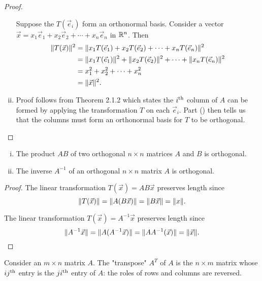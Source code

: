 \documentclass[a4paper,8pt]{article}
\begin{document}
\begin{outline}
\begin{proof}
\begin{enumerate}[i.]
          \backward Suppose the \(T(\vec{e}_i)\) form an orthonormal basis. Consider a vector \(\vec{x} = x_1\vec{e}_1 + x_2\vec{e}_2 + \cdots
          + x_n\vec{e}_n\) in \(\mathbb{R}^n\). Then
          \begin{align*}
            \|T(\vec{x})\|^2 &= \|x_1T(\vec{e}_1) + x_2T(\vec{e}_2) + \cdots + x_nT(\vec{e}_n)\|^2 \\
                                &= \|x_1T(\vec{e}_1)\|^2 + \|x_2T(\vec{e}_2)\|^2 + \cdots + \|x_nT(\vec{e}_n)\|^2 \\
                                &= x_1^2 + x_2^2 + \cdots + x_n^2 \\
                                &= \|\vec{x}\|^2\text{.}
          \end{align*}
        \item
          Proof follows from Theorem 2.1.2 which states the \(i\textsuperscript{th}\) column of \(A\) can be formed by applying the transformation \(T\) on each
          \(\vec{e}_i\). Part () then tells us that the columns must form an orthonormal basis for \(T\) to be orthogonal.
      \end{enumerate}
    \end{proof}

    \begin{enumerate}[i.]
      \item The product \(AB\) of two orthogonal \(n \times n\) matrices \(A\) and \(B\) is orthogonal.
      \item The inverse \(A^{-1}\) of an orthogonal \(n \times n\) matrix \(A\) is orthogonal.
    \end{enumerate}

    \begin{proof}
      \item
        The linear transformation \(T(\vec{x}) = AB\vec{x}\) preserves length since
        \[ \|T(\vec{x})\| = \|A(B\vec{x})\| = \|B\vec{x}\| = \|x\|\text{.} \]
      \item
        The linear transformation \(T(\vec{x}) = A^{-1}\vec{x}\) preserves length since
        \[ \|A^{-1}\vec{x}\| = \|A(A^{-1}\vec{x})\| = \|AA^{-1}(\vec{x})\| = \|\vec{x}\|\text{.} \]
    \end{proof}

    Consider an \(m \times n\) matrix \(A\). The "transpose" \(A^T\) of \(A\) is the \(n \times m\) matrix whose \(ij\textsuperscript{th}\)
    entry is the \(ji\textsuperscript{th}\) entry of \(A\): the roles of rows and columns are reversed.


\end{outline}
\end{document}
